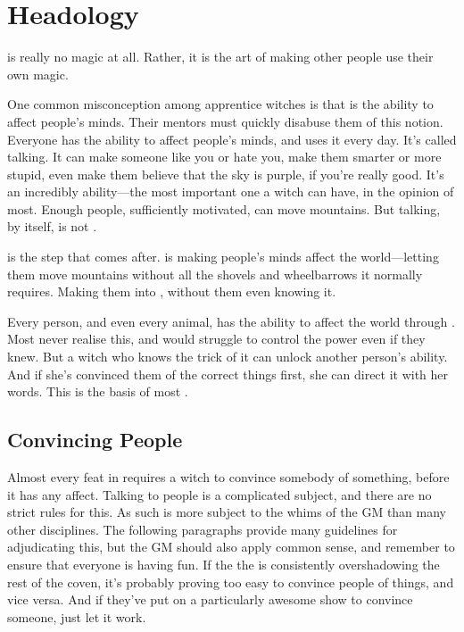 \chapter{Headology}

 is really no magic at all.
Rather, it is the art of making other people use their own magic.

One common misconception among apprentice witches is that  is the ability to affect people's minds.
Their mentors must quickly disabuse them of this notion.
Everyone has the ability to affect people's minds, and uses it every day.
It's called talking.
It can make someone like you or hate you, make them smarter or more stupid, even make them believe that the sky is purple, if you're really good.
It's an incredibly ability---the most important one a witch can have, in the opinion of most.
Enough people, sufficiently motivated, can move mountains.
But talking, by itself, is not .

 is the step that comes after.
 is making people's minds affect the world---letting them move mountains without all the shovels and wheelbarrows it normally requires.
Making them into , without them even knowing it.

Every person, and even every animal, has the ability to affect the world through .
Most never realise this, and would struggle to control the power even if they knew.
But a witch who knows the trick of it can unlock another person's ability.
And if she's convinced them of the correct things first, she can direct it with her words.
This is the basis of most .

\section{Convincing People}

Almost every feat in  requires a witch to convince somebody of something, before it has any affect.
Talking to people is a complicated subject, and there are no strict rules for this.
As such  is more subject to the whims of the GM than many other disciplines.
The following paragraphs provide many guidelines for adjudicating this, but the GM should also apply common sense, and remember to ensure that everyone is having fun.
If the the  is consistently overshadowing the rest of the coven, it's probably proving too easy to convince people of things, and vice versa.
And if they've put on a particularly awesome show to convince someone, just let it work.

